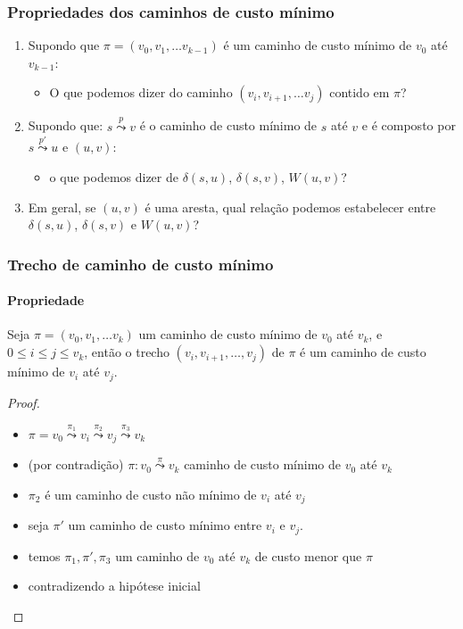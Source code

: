 \documentclass{beamer}
\begin{document}
\begin{frame}
\frametitle{Propriedades dos caminhos de custo mínimo}

\begin{enumerate}
\item Supondo que $\pi = (v_0, v_1, \ldots v_{k-1})$ é um caminho de custo
  mínimo de $v_0$ até $v_{k-1}$:
\begin{itemize}
\item O que podemos dizer do caminho $(v_i, v_{i+1}, \ldots v_{j})$ contido em
  $\pi$?
\end{itemize}
\pause
\item Supondo que: $s \overset{p}{\leadsto} v$ é o caminho de custo mínimo de $s$ até $v$
  e é composto por $s \overset{p'}{\leadsto} u$ e $(u, v)$:
\begin{itemize}
\item o que podemos dizer de $\delta(s, u)$, $\delta(s, v)$, $W(u, v)$?
\end{itemize}
\pause 
\item Em geral, se $(u, v)$ é uma aresta, qual relação podemos estabelecer
entre $\delta(s, u)$, $\delta(s, v)$ e $W(u, v)$?
\end{enumerate}
\end{frame}

\begin{frame}
\frametitle{Trecho de caminho de custo mínimo}
\framesubtitle{Propriedade}

\begin{lemma}
Seja $\pi = (v_0, v_1, \ldots v_k)$ um caminho de custo mínimo de $v_0$ até
$v_k$, e $0 \le i \le j \le v_k$, então o trecho $(v_i, v_{i+1}, \ldots, v_j)$
de $\pi$ é um caminho de custo mínimo de $v_i$ até $v_j$.
\end{lemma}
\pause
\begin{proof}
\begin{itemize}
\item $\pi = v_0 \overset{\pi_1}{\leadsto} v_i \overset{\pi_2}{\leadsto} v_j \overset{\pi_3}{\leadsto} v_k$
\item \alert{(por contradição)} $\pi : v_0 \overset{\pi}{\leadsto} v_k$ caminho de custo mínimo de $v_0$ até $v_k$
\item $\pi_2$ é um caminho de custo não mínimo de $v_i$ até $v_j$
\item seja $\pi'$ um caminho de custo mínimo entre $v_i$ e $v_j$.
\item temos $\pi_1, \pi', \pi_3$ um caminho de $v_0$ até $v_k$ de custo menor que $\pi$
\item \alert{contradizendo} a hipótese inicial
\end{itemize}
\end{proof}
\end{frame}
\end{document}
